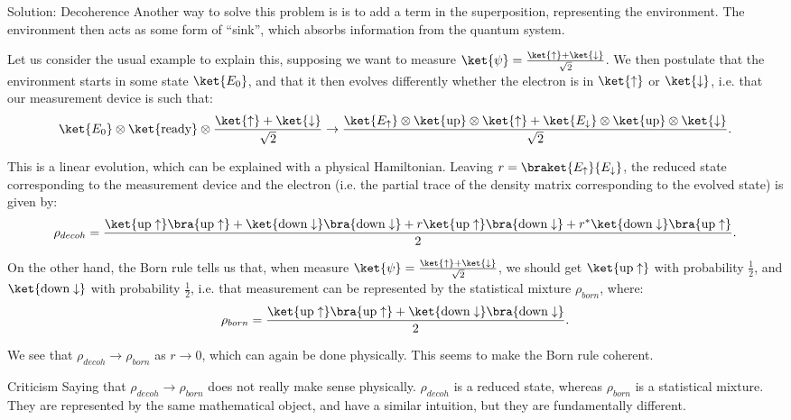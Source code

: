 \documentclass[a4paper]{article}
\begin{document}
\begin{parag}{Solution: Decoherence}
    Another way to solve this problem is is to add a term in the superposition, representing the environment. The environment then acts as some form of ``sink'', which absorbs information from the quantum system.

    Let us consider the usual example to explain this, supposing we want to measure $\ket{\psi} = \frac{\ket{\uparrow} + \ket{\downarrow}}{\sqrt{2}}$. We then postulate that the environment starts in some state $\ket{E_0}$, and that it then evolves differently whether the electron is in $\ket{\uparrow}$ or $\ket{\downarrow}$, i.e. that our measurement device is such that: 
    \[\ket{E_0} \otimes \ket{\text{ready}} \otimes \frac{\ket{\uparrow} + \ket{\downarrow}}{\sqrt{2}} \to \frac{\ket{E_{\uparrow}} \otimes \ket{\text{up}} \otimes \ket{\uparrow} + \ket{E_{\downarrow}} \otimes \ket{\text{up}} \otimes\ket{\downarrow}}{\sqrt{2}}.\]

    This is a linear evolution, which can be explained with a physical Hamiltonian. Leaving $r = \braket{E_{\uparrow}}{E_{\downarrow}}$, the reduced state corresponding to the measurement device and the electron (i.e. the partial trace of the density matrix corresponding to the evolved state) is given by: 
    \[\rho_{decoh} = \frac{\ket{\text{up}\uparrow}\bra{\text{up}\uparrow} + \ket{\text{down}\downarrow}\bra{\text{down}\downarrow} + r\ket{\text{up}\uparrow}\bra{\text{down}\downarrow} + r^*\ket{\text{down}\downarrow}\bra{\text{up}\uparrow}}{2}.\]

    On the other hand, the Born rule tells us that, when measure $\ket{\psi} = \frac{\ket{\uparrow} + \ket{\downarrow}}{\sqrt{2}}$, we should get $\ket{\text{up}\uparrow}$ with probability $\frac{1}{2}$, and $\ket{\text{down}\downarrow}$ with probability $\frac{1}{2}$, i.e. that measurement can be represented by the statistical mixture $\rho_{born}$, where: 
    \[\rho_{born} = \frac{\ket{\text{up}\uparrow}\bra{\text{up}\uparrow} + \ket{\text{down}\downarrow}\bra{\text{down}\downarrow}}{2}.\]

    We see that $\rho_{decoh} \to \rho_{born}$ as $r \to 0$, which can again be done physically. This seems to make the Born rule coherent.
    
    \begin{subparag}{Criticism}
        Saying that $\rho_{decoh} \to \rho_{born}$ does not really make sense physically. $\rho_{decoh}$ is a reduced state, whereas $\rho_{born}$ is a statistical mixture. They are represented by the same mathematical object, and have a similar intuition, but they are fundamentally different.


\end{subparag}
\end{parag}
\end{document}

